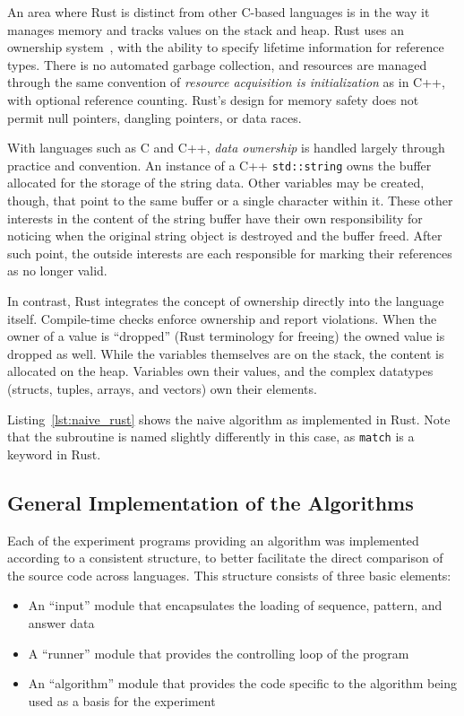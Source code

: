 An area where Rust is distinct from other C-based languages is in the way it manages memory and tracks values on the stack and heap. Rust uses an ownership system~\cite[Chapter~4]{programming.rust.2021}, with the ability to specify lifetime information for reference types. There is no automated garbage collection, and resources are managed through the same convention of \textit{resource acquisition is initialization} as in C++, with optional reference counting. Rust's design for memory safety does not permit null pointers, dangling pointers, or data races.

With languages such as C and C++, \textit{data ownership} is handled largely through practice and convention. An instance of a C++ \texttt{std::string} owns the buffer allocated for the storage of the string data. Other variables may be created, though, that point to the same buffer or a single character within it. These other interests in the content of the string buffer have their own responsibility for noticing when the original string object is destroyed and the buffer freed. After such point, the outside interests are each responsible for marking their references as no longer valid.

In contrast, Rust integrates the concept of ownership directly into the language itself. Compile-time checks enforce ownership and report violations. When the owner of a value is ``dropped'' (Rust terminology for freeing) the owned value is dropped as well. While the variables themselves are on the stack, the content is allocated on the heap. Variables own their values, and the complex datatypes (structs, tuples, arrays, and vectors) own their elements.

Listing~\ref{lst:naive_rust} shows the naive algorithm as implemented in Rust. Note that the subroutine is named slightly differently in this case, as \texttt{match} is a keyword in Rust.



\subsection{General Implementation of the Algorithms}

Each of the experiment programs providing an algorithm was implemented according to a consistent structure, to better facilitate the direct comparison of the source code across languages. This structure consists of three basic elements:

\begin{itemize}
\item An ``input'' module that encapsulates the loading of sequence, pattern, and answer data
\item A ``runner'' module that provides the controlling loop of the program
\item An ``algorithm'' module that provides the code specific to the algorithm being used as a basis for the experiment
\end{itemize}

